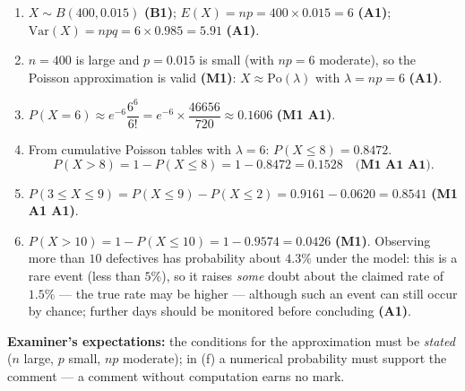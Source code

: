 \documentclass[11pt]{article}
\begin{document}
\begin{corrige}
\begin{enumerate}
\item $X \sim B(400, 0.015)$ \textbf{(B1)}; $E(X) = np = 400 \times 0.015 = 6$ \textbf{(A1)}; $\mathrm{Var}(X) = npq = 6 \times 0.985 = 5.91$ \textbf{(A1)}.
\item $n = 400$ is large and $p = 0.015$ is small (with $np = 6$ moderate), so the Poisson approximation is valid \textbf{(M1)}: $X \approx \mathrm{Po}(\lambda)$ with $\lambda = np = 6$ \textbf{(A1)}.
\item $P(X = 6) \approx e^{-6}\dfrac{6^6}{6!} = e^{-6}\times\dfrac{46656}{720} \approx \mathbf{0.1606}$ \textbf{(M1 A1)}.
\item From cumulative Poisson tables with $\lambda = 6$: $P(X \leq 8) = 0.8472$.
\[ P(X > 8) = 1 - P(X \leq 8) = 1 - 0.8472 = \mathbf{0.1528} \quad \textbf{(M1 A1 A1)}. \]
\item $P(3 \leq X \leq 9) = P(X \leq 9) - P(X \leq 2) = 0.9161 - 0.0620 = \mathbf{0.8541}$ \textbf{(M1 A1 A1)}.
\item $P(X > 10) = 1 - P(X \leq 10) = 1 - 0.9574 = 0.0426$ \textbf{(M1)}. Observing more than $10$ defectives has probability about $4.3\%$ under the model: this is a rare event (less than $5\%$), so it raises \emph{some} doubt about the claimed rate of $1.5\%$ — the true rate may be higher — although such an event can still occur by chance; further days should be monitored before concluding \textbf{(A1)}.
\end{enumerate}
\textbf{Examiner's expectations:} the conditions for the approximation must be \emph{stated} ($n$ large, $p$ small, $np$ moderate); in (f) a numerical probability must support the comment — a comment without computation earns no mark.
\end{corrige}
\end{document}
